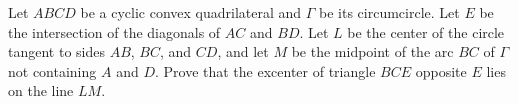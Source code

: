 Let $ABCD$ be a cyclic convex quadrilateral and $\Gamma$ be its circumcircle. Let $E$ be the intersection of the diagonals of $AC$ and $BD$. Let $L$ be the center of the circle tangent to sides $AB$, $BC$, and $CD$, and let $M$ be the midpoint of the arc $BC$ of $\Gamma$ not containing $A$ and $D$. Prove that the excenter of triangle $BCE$ opposite $E$ lies on the line $LM$.
